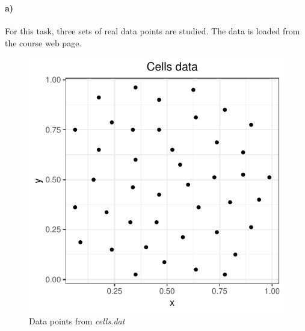 \section{}
\label{sec:problem1}
\paragraph{a)}

For this task, three sets of real data points are studied. The data is loaded from the course web page.

\begin{figure}
    \centering
    \includegraphics[scale=0.95]{figures/prob1_cells_points.pdf}
    \caption{Data points from \textit{cells.dat}}
    \label{fig:cells_points}
\end{figure}

